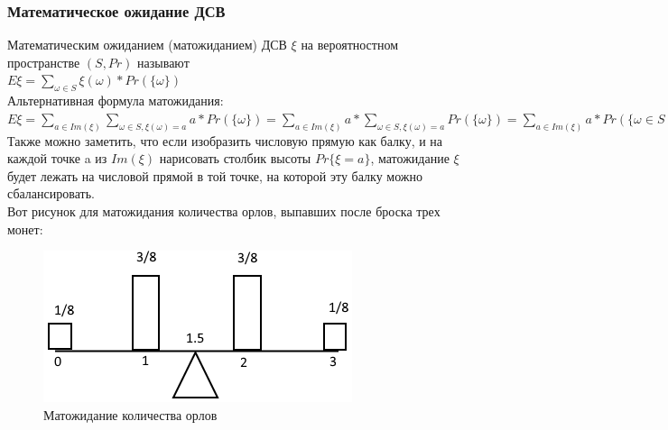 \subsubsection{Математическое ожидание ДСВ}
Математическим ожиданием (матожиданием) ДСВ $\xi$ на вероятностном пространстве $(S, Pr)$ называют\\
$E \xi = \sum\limits_{\omega \in S}\xi(\omega) * Pr(\{\omega\})$\\
Альтернативная формула матожидания:\\
$E \xi = \sum\limits_{a \in Im(\xi)} \sum_{\omega \in S, \xi(\omega) = a} a * Pr(\{\omega\}) = \sum\limits_{a \in Im(\xi)} a * \sum_{\omega \in S, \xi(\omega) = a}Pr(\{\omega\}) = \sum\limits_{a \in Im(\xi)} a * Pr(\{\omega \in S \; : \; \xi(\omega) = a\}) = \sum\limits_{a \in Im(\xi)} a * Pr\{\xi = a\}$\\
Также можно заметить, что если изобразить числовую прямую как балку, и на каждой точке a из $Im(\xi)$ нарисовать столбик высоты $Pr\{\xi = a\}$, матожидание $\xi$ будет лежать на числовой прямой в той точке, на которой эту балку можно сбалансировать.\\
Вот рисунок для матожидания количества орлов, выпавших после броска трех монет:\\
\begin{figure}
\includegraphics[width=\linewidth]{HeadsTails.png}
\caption{Матожидание количества орлов}
\label{fig:HeadsTails}
\end{figure}
